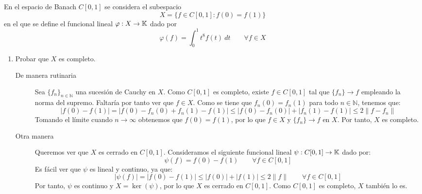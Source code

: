 \documentclass[12pt]{article}
\begin{document}
    \newpage
    \setcounter{ejercicio}{0} %
    \begin{ejercicio}
        En el espacio de Banach $C[0,1]$ se considera el subespacio
        \begin{equation*}
            X = \{f\in C[0,1] : f(0) = f(1)\}
        \end{equation*}
        en el que se define el funcional lineal $\varphi:X\to \mathbb{K}$ dado por
        \begin{equation*}
            \varphi(f) = \int_{0}^{1} t^8 f(t)~dt  \qquad \forall f\in X
        \end{equation*}
        \begin{enumerate}[label=(\alph*)]
            \item Probar que $X$ es completo.            
            \begin{description}
                \item[De manera rutinaria] Sea $\{f_n\}_{n\in \mathbb{N}}$ una sucesión de Cauchy en $X$. Como $C[0,1]$ es completo, existe $f\in C[0,1]$ tal que $\{f_n\}\to f$ empleando la norma del supremo. Faltaría por tanto ver que $f\in X$. Como se tiene que $f_n(0) = f_n(1)$ para todo $n\in \mathbb{N}$, tenemos que:
                \begin{equation*}
                    |f(0) - f(1)| = |f(0) - f_n(0) + f_n(1) - f(1)| \leq |f(0) - f_n(0)| + |f_n(1) - f(1)| \leq 2\|f - f_n\|
                \end{equation*}
                Tomando el límite cuando $n\to \infty$ obtenemos que $f(0) = f(1)$, por lo que $f\in X$ y $\{f_n\}\to f$ en $X$. Por tanto, $X$ es completo.

                \item[Otra manera] Queremos ver que $X$ es cerrado en $C[0,1]$. Consideramos el siguiente funcional lineal $\psi:C[0,1]\to \mathbb{K}$ dado por:
                \begin{equation*}
                    \psi(f) = f(0) - f(1) \qquad \forall f\in C[0,1]
                \end{equation*}
                Es fácil ver que $\psi$ es lineal y continuo, ya que:
                \begin{equation*}
                    |\psi(f)| = |f(0) - f(1)| \leq |f(0)| + |f(1)| \leq 2\|f\| \qquad \forall f\in C[0,1]
                \end{equation*}
                Por tanto, $\psi$ es continuo y $X = \ker(\psi)$, por lo que $X$ es cerrado en $C[0,1]$. Como $C[0,1]$ es completo, $X$ también lo es.
            \end{description}
            

\end{enumerate}
\end{ejercicio}
\end{document}
